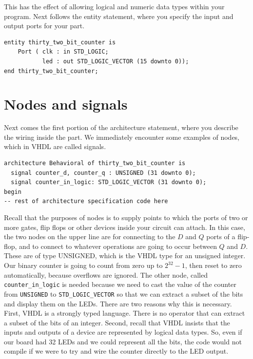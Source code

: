 \documentclass[../physical_computing.tex]{subfiles}
\begin{document}
This has the effect of allowing logical and numeric data types within your program. Next follows the entity statement, where you specify the input and output ports for your part.

\begin{verbatim}
entity thirty_two_bit_counter is
    Port ( clk : in STD_LOGIC;
           led : out STD_LOGIC_VECTOR (15 downto 0));
end thirty_two_bit_counter;
\end{verbatim}

\section{Nodes and signals}
\label{sec:nodesandsignals}

Next comes the first portion of the architecture statement, where you describe the wiring inside the part. We immediately encounter some examples of nodes, which in VHDL are called signals.

\begin{verbatim}
architecture Behavioral of thirty_two_bit_counter is
  signal counter_d, counter_q : UNSIGNED (31 downto 0);
  signal counter_in_logic: STD_LOGIC_VECTOR (31 downto 0);
begin
-- rest of architecture specification code here
\end{verbatim}

Recall that the purposes of nodes is to supply points to which the ports of two or more gates, flip flops or other devices inside your circuit can attach. In this case, the two nodes on the upper line are for connecting to the $D$ and $Q$ ports of a flip-flop, and to connect to whatever operations are going to occur between $Q$ and $D$. These are of type UNSIGNED, which is the VHDL type for an unsigned integer. Our binary counter is going to count from zero up to $2^{32}-1$, then reset to zero automatically, because overflows are ignored. The other node, called \texttt{counter\_in\_logic} is needed because we need to cast the value of the counter from \texttt{UNSIGNED} to \texttt{STD\_LOGIC\_VECTOR} so that we can extract a subset of the bits and display them on the LEDs. There are two reasons why this is necessary. First, VHDL is a strongly typed language. There is no operator that can extract a subset of the bits of an integer. Second, recall that VHDL insists that the inputs and outputs of a device are represented by logical data types. So, even if our board had 32 LEDs and we could represent all the bits, the code would not compile if we were to try and wire the counter directly to the LED output.
\end{document}
